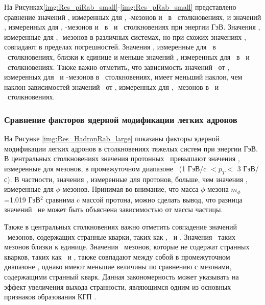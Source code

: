 На Рисунках\ref{img:Res_piRab_small}-\ref{img:Res_pRab_small} представлено сравнение значений \rab, измеренных для  \pipm, \Kpm-мезонов и \aprot \ в \pal \ столкновениях, и значений \rab, измеренных для \pipm, \Kpm-мезонов и \prots \ в \dau \ и \heau \ столкновениях при энергии  ГэВ. Значения \rab, измеренные для \pipm, \Kpm-мезонов в различных системах, но при схожих значениях \Npart, совпадают в пределах погрешностей. Значения \rab, измеренные для \aprot \ в \pal \ столкновениях, близки к единице и меньше значений \rab, измеренных для \prots \ в \heau \ и \dau \ столкновениях. Также важно отметить, что зависимость значений \rab \ от \pt, измеренных для \pipm \ и \Kpm-мезонов в \pal \ столкновениях, имеет меньший наклон, чем наклон зависимостей значений \rab \ от \pt, измеренных для \pipm, \Kpm-мезонов в \dau \ и \heau \ столкновениях. 

\subsubsection{Сравнение факторов ядерной модификации легких адронов}
На Рисунке \ref{img:Res_HadronRab_large} показаны факторы ядерной модификации легких адронов в столкновениях тяжелых систем при энергии  ГэВ. В центральных столкновениях значения протонных \rab \ превышают значения \rab, измеренные для мезонов, в промежуточном диапазоне \pt \ (1 ГэВ/c $< p_T <$ 3 ГэВ/с). В частности, значения \rab, измеренные для протонов, больше, чем значения \rab, измеренные для $\phi$-мезонов. Принимая во внимание, что масса $\phi$-мезона $m_{\phi}$=1.019 ГэВ$^{2}$ сравнима c массой протона, можно сделать вывод, что разница значений \rab \ не может быть объяснена зависимостью от массы частицы.  


Также в центральных столкновениях важно отметить совпадение значений \rab \ мезонов, содержащих странные кварки, таких как \Kstar, \phim \ и \Kpm. Значения \rab \ таких мезонов близки к единице. Значения \rab \ мезонов, которые не содержат странных кварков, таких как \pio \ и \pipm,  также совпадают между собой в промежуточном диапазоне \pt, однако имеют меньшие величины по сравнению с мезонами, содержащими странный кварк. Данная закономерность может указывать на эффект увеличения выхода странности, являющимся одним из основных признаков образования КГП \cite{Strangeness_QGP, StrangEnh, ThermalStrangeness}.

